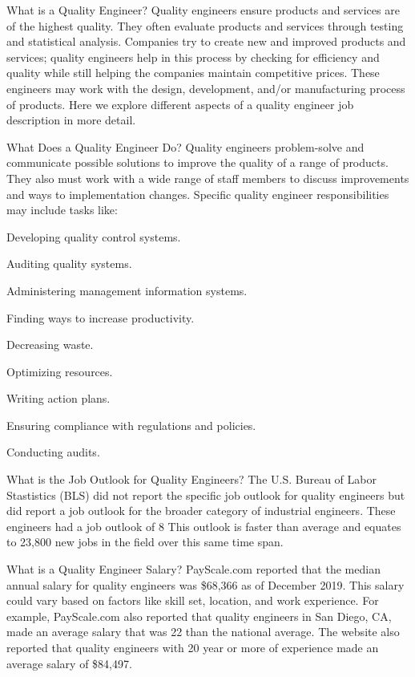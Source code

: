 What is a Quality Engineer?
Quality engineers ensure products and
services are of the highest quality.
They often evaluate products and services
through testing and statistical analysis.
Companies try to create new and improved
products and services; quality engineers
help in this process by checking for
efficiency and quality while still helping
the companies maintain competitive prices.
These engineers may work with the design,
development, and/or manufacturing process of
products.
Here we explore different aspects of a
quality engineer job description in more
detail.

What Does a Quality Engineer Do?
Quality engineers problem-solve and communicate
possible solutions to improve the quality of
a range of products. They also must work with
a wide range of staff members to discuss
improvements and ways to implementation
changes. Specific quality engineer
responsibilities may include tasks like:

Developing quality control systems.

Auditing quality systems.

Administering management information systems.

Finding ways to increase productivity.

Decreasing waste.

Optimizing resources.

Writing action plans.

Ensuring compliance with regulations and policies.

Conducting audits.

What is the Job Outlook for Quality Engineers?
The U.S. Bureau of Labor Stastistics (BLS)
did not report the specific job outlook for
quality engineers but did report a job outlook
for the broader category of industrial
engineers. These engineers had a job outlook of
8%
This outlook is faster than average and
equates to 23,800 new jobs in the field
over this same time span.

What is a Quality Engineer Salary?
PayScale.com reported that the median annual
salary for quality engineers was \$68,366
as of December 2019.
This salary could vary based on factors like
skill set, location, and work experience.
For example, PayScale.com also reported
that quality engineers in San Diego, CA,
made an average salary that was 22%
than the national average.
The website also reported that quality
engineers with 20 year or more of experience
made an average salary of \$84,497.

